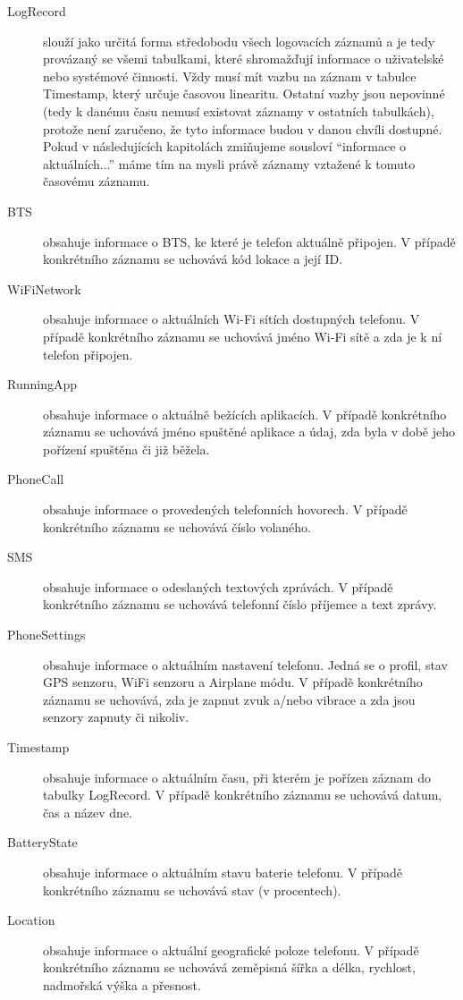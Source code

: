 \documentclass[thesis=M,czech]{FITthesis}[2012/06/26]
\begin{document}
\begin{description}
\item[LogRecord]
slouží jako určitá forma středobodu všech logovacích záznamů a je tedy provázaný se všemi tabulkami, které shromažďují informace o uživatelské nebo systémové činnosti. Vždy musí mít vazbu na záznam v tabulce Timestamp, který určuje časovou linearitu. Ostatní vazby jsou nepovinné (tedy k danému času nemusí existovat záznamy v ostatních tabulkách), protože není zaručeno, že tyto informace budou v danou chvíli dostupné. Pokud v následujících kapitolách zmiňujeme sousloví “informace o aktuálních...” máme tím na mysli právě záznamy vztažené k tomuto časovému záznamu.

\item[BTS]
obsahuje informace o BTS, ke které je telefon aktuálně připojen. V případě konkrétního záznamu se uchovává kód lokace a její ID.

\item[WiFiNetwork]
obsahuje informace o aktuálních Wi-Fi sítích dostupných telefonu. V případě konkrétního záznamu se uchovává jméno Wi-Fi sítě a zda je k ní telefon připojen.

\item[RunningApp]
obsahuje informace o aktuálně bežících aplikacích. V případě konkrétního záznamu se uchovává jméno spuštěné aplikace a údaj, zda byla v době jeho pořízení spuštěna či již běžela.

\item[PhoneCall]
obsahuje informace o provedených telefonních hovorech. V případě konkrétního záznamu se uchovává číslo volaného.

\item[SMS]
obsahuje informace o odeslaných textových zprávách. V případě konkrétního záznamu se uchovává telefonní číslo příjemce a text zprávy.

\item[PhoneSettings]
obsahuje informace o aktuálním nastavení telefonu. Jedná se o profil, stav GPS senzoru, WiFi senzoru a Airplane módu. V případě konkrétního záznamu se uchovává, zda je zapnut zvuk a/nebo vibrace a zda jsou senzory zapnuty či nikoliv.

\item[Timestamp]
obsahuje informace o aktuálním času, při kterém je pořízen záznam do tabulky LogRecord. V případě konkrétního záznamu se uchovává datum, čas a název dne.

\item[BatteryState]
obsahuje informace o aktuálním stavu baterie telefonu. V případě konkrétního záznamu se uchovává stav (v procentech).

\item[Location]
obsahuje informace o aktuální geografické poloze telefonu. V případě konkrétního záznamu se uchovává zeměpisná šířka a délka, rychlost, nadmořská výška a přesnost.
\end{description}
\end{document}
